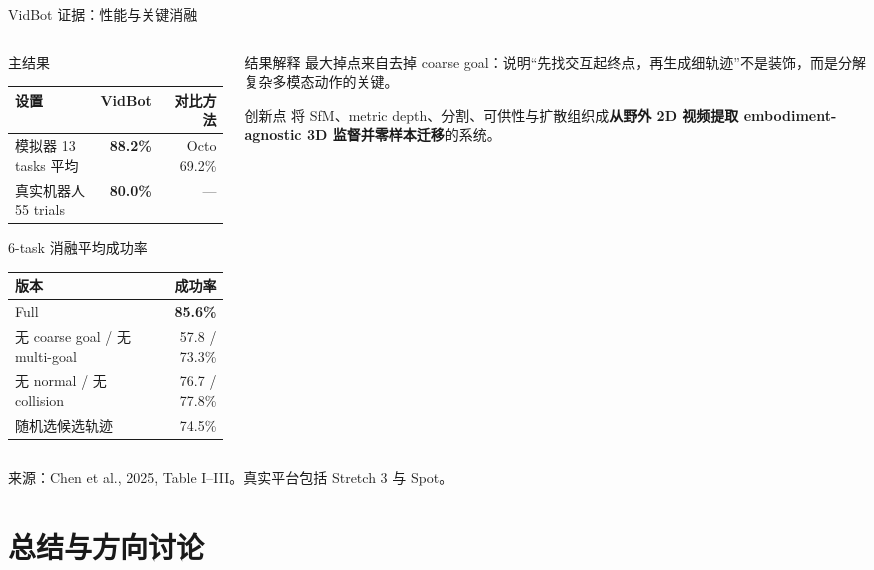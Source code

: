 \documentclass[aspectratio=169,10pt]{beamer}
\newcommand{\src}[1]{\vfill{\fontsize{5.8}{6.8}\selectfont\color{CUHKMidGray}来源：#1}}
\begin{document}
\begin{frame}{VidBot 证据：性能与关键消融}
  \small
  \begin{columns}[T,onlytextwidth]
    \begin{column}{.55\textwidth}
      \begin{block}{主结果}
        \begin{tabular}{lrr}
          \toprule
          设置 & VidBot & 对比方法\\
          \midrule
          模拟器 13 tasks 平均 & \textbf{88.2\%} & Octo 69.2\%\\
          真实机器人 55 trials & \textbf{80.0\%} & ---\\
          \bottomrule
        \end{tabular}
      \end{block}
      \begin{block}{6-task 消融平均成功率}
        \begin{tabular}{lr}
          \toprule
          版本 & 成功率\\
          \midrule
          Full & \textbf{85.6\%}\\
          无 coarse goal / 无 multi-goal & 57.8 / 73.3\%\\
          无 normal / 无 collision & 76.7 / 77.8\%\\
          随机选候选轨迹 & 74.5\%\\
          \bottomrule
        \end{tabular}
      \end{block}
    \end{column}
    \begin{column}{.41\textwidth}
      \begin{alertblock}{结果解释}
        最大掉点来自去掉 coarse goal：说明“先找交互起终点，再生成细轨迹”不是装饰，而是分解复杂多模态动作的关键。
      \end{alertblock}
      \begin{block}{创新点}
        将 SfM、metric depth、分割、可供性与扩散组织成\textbf{从野外 2D 视频提取 embodiment-agnostic 3D 监督并零样本迁移}的系统。
      \end{block}
    \end{column}
  \end{columns}
  \src{Chen et al., 2025, Table I--III。真实平台包括 Stretch 3 与 Spot。}
\end{frame}

\section{总结与方向讨论}
\end{document}
